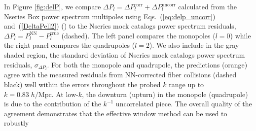                                                                                                                                                                                                                                                                             In Figure \ref{fig:delP}, we compare $\Delta P_l = \Delta P_l^\mathrm{corr} + 
                                                                                                                                                                                                                                                                            \Delta P_l^\mathrm{uncorr}$ calculated from the Nseries Box power spectrum multipoles using Eqs.~(\ref{eq:delp_uncorr}) and~(\ref{DeltaPell2}) (\nseriescolor) to the Nseries mock catalogs power spectrum residuals, $\Delta P_l = P_l^\mathrm{NN} - P_l^\mathrm{true}$ (dashed). 
                                                                                                                                                                                                                                                                            The left panel compares the monopoles ($l = 0$) while the right panel compares 
                                                                                                                                                                                                                                                                            the quadrupoles ($l=2$). We also include in the gray shaded 
                                                                                                                                                                                                                                                                            region, the standard deviation of Nseries mock catalogs power spectrum residuals,
                                                                                                                                                                                                                                                                            $\sigma_{\Delta P_l}$. For both the monopole and quadrupole, the predictions (orange) agree with the measured residuals from NN-corrected fiber collisions (dashed black) well within the errors throughout the probed $k$ range up to $k=0.83\;h/\mathrm{Mpc}$. At low-$k$, the downturn (upturn) in the monopole (quadrupole) is due to the contribution of the $k^{-1}$ uncorrelated piece. 
                                                                                                                                                                                                                                                                            The overall quality of the  agreement demonstrates that the effective window method can be used to robustly 
